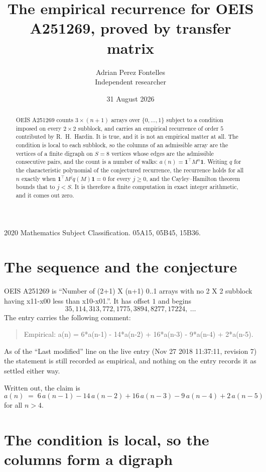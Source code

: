 \documentclass[11pt,a4paper]{article}
\title{The empirical recurrence for OEIS A251269, proved by transfer matrix}
\author{Adrian Perez Fontelles\\ \small Independent researcher}
\date{31 August 2026}
\theoremstyle{plain}
\theoremstyle{definition}
\begin{document}
\maketitle

\begin{abstract}
OEIS A251269 counts $3\times(n+1)$ arrays over $\{0,\dots,1\}$ subject to a condition imposed on
every $2\times2$ subblock, and carries an empirical recurrence of order $5$ contributed
by R.~H.~Hardin. It is true, and it is not an empirical matter at all. The condition is local
to each subblock, so the columns of an admissible array are the vertices of a finite digraph
on $S=8$ vertices whose edges are the admissible consecutive pairs, and the count is a
number of walks: $a(n)=\mathbf{1}^{\!\top}M^{n}\mathbf{1}$. Writing $q$
for the characteristic polynomial of the conjectured recurrence, the recurrence holds for all
$n$ exactly when $\mathbf{1}^{\!\top}M^{j}q(M)\mathbf{1}=0$ for every $j\ge0$, and the
Cayley--Hamilton theorem bounds that to $j<S$. It is therefore a finite computation in exact
integer arithmetic, and it comes out zero.
\end{abstract}

\noindent\small 2020 Mathematics Subject Classification. 05A15, 05B45, 15B36.\normalsize

\section{The sequence and the conjecture}

OEIS A251269 is ``Number of (2+1) X (n+1) 0..1 arrays with no 2 X 2 subblock having x11-x00 less than x10-x01.''. It has offset $1$ and begins
\[
35, 114, 313, 772, 1775, 3894, 8277, 17224,\ \dots
\]
The entry carries the following comment:
\begin{quote}\small
Empirical: a(n) = 6*a(n-1) - 14*a(n-2) + 16*a(n-3) - 9*a(n-4) + 2*a(n-5).
\end{quote}
As of the ``Last modified'' line on the live entry (Nov 27 2018 11:37:11, revision 7) the statement is
still recorded as empirical, and nothing on the entry records it as settled either way.

Written out, the claim is
\begin{equation}\label{eq:conj}
a(n)\;=\;6\,a(n-1) - 14\,a(n-2) + 16\,a(n-3) - 9\,a(n-4) + 2\,a(n-5)
\end{equation}
for all $n>4$.

\section{The condition is local, so the columns form a digraph}
\end{document}
